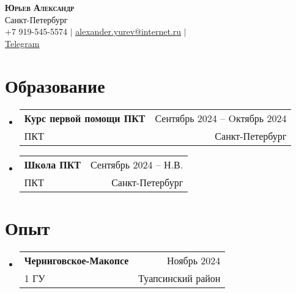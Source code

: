 \documentclass[A4,11pt]{article}
\makeatletter
\newcommand{\CVSubheading}[4]{
  \vspace{-2pt}\item
    \begin{tabular*}{0.97\textwidth}[t]{l@{\extracolsep{\fill}}r}
      \textbf{#1} & #2 \\
      \small#3 & \small #4 \\
    \end{tabular*}\vspace{-7pt}
}
\newcommand{\CVSubHeadingListStart}{\begin{itemize}[leftmargin=0.5cm, label={}]}
\newcommand{\CVSubHeadingListEnd}{\end{itemize}}
\makeatother
\begin{document}
\begin{center}
  \textbf{\Huge \scshape Юрьев Александр} \\ \vspace{1pt} %
  \small Санкт-Петербург  \\
  \small +7 919-545-5574 $|$ \href{mailto:alexander.yurev@internet.ru}{\underline{alexander.yurev@internet.ru}} $|$\\
  \href{https://tg-me.ru/Sapfir0}{\underline{Telegram}}

\end{center}


\section{Образование}
\CVSubHeadingListStart
\CVSubheading
{{Курс первой помощи ПКТ}}{Сентябрь 2024 -- Oктябрь 2024}
{ПКТ}{Санкт-Петербург}

\CVSubheading
{{Школа ПКТ}}{Сентябрь 2024 -- Н.В.}
{ПКТ}{Санкт-Петербург}

\CVSubHeadingListEnd

\section{Опыт}
\CVSubHeadingListStart
\CVSubheading
{{Черниговское-Макопсе}}{Ноябрь 2024}
{1 ГУ}{Туапсинский район}

\CVSubHeadingListEnd
\end{document}
